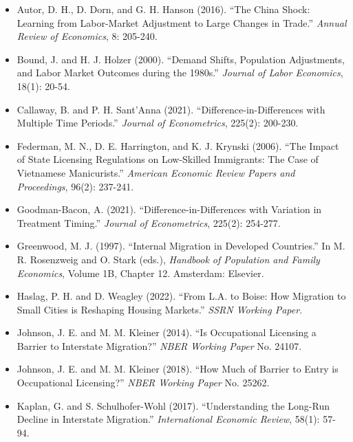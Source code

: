 \documentclass[12pt]{article}
\begin{document}
\begin{itemize}
\item Autor, D. H., D. Dorn, and G. H. Hanson (2016). ``The China Shock: Learning from Labor-Market Adjustment to Large Changes in Trade.'' \textit{Annual Review of Economics}, 8: 205-240.

\item Bound, J. and H. J. Holzer (2000). ``Demand Shifts, Population Adjustments, and Labor Market Outcomes during the 1980s.'' \textit{Journal of Labor Economics}, 18(1): 20-54.

\item Callaway, B. and P. H. Sant'Anna (2021). ``Difference-in-Differences with Multiple Time Periods.'' \textit{Journal of Econometrics}, 225(2): 200-230.

\item Federman, M. N., D. E. Harrington, and K. J. Krynski (2006). ``The Impact of State Licensing Regulations on Low-Skilled Immigrants: The Case of Vietnamese Manicurists.'' \textit{American Economic Review Papers and Proceedings}, 96(2): 237-241.

\item Goodman-Bacon, A. (2021). ``Difference-in-Differences with Variation in Treatment Timing.'' \textit{Journal of Econometrics}, 225(2): 254-277.

\item Greenwood, M. J. (1997). ``Internal Migration in Developed Countries.'' In M. R. Rosenzweig and O. Stark (eds.), \textit{Handbook of Population and Family Economics}, Volume 1B, Chapter 12. Amsterdam: Elsevier.

\item Haslag, P. H. and D. Weagley (2022). ``From L.A. to Boise: How Migration to Small Cities is Reshaping Housing Markets.'' \textit{SSRN Working Paper}.

\item Johnson, J. E. and M. M. Kleiner (2014). ``Is Occupational Licensing a Barrier to Interstate Migration?'' \textit{NBER Working Paper} No. 24107.

\item Johnson, J. E. and M. M. Kleiner (2018). ``How Much of Barrier to Entry is Occupational Licensing?'' \textit{NBER Working Paper} No. 25262.

\item Kaplan, G. and S. Schulhofer-Wohl (2017). ``Understanding the Long-Run Decline in Interstate Migration.'' \textit{International Economic Review}, 58(1): 57-94.


\end{itemize}
\end{document}
